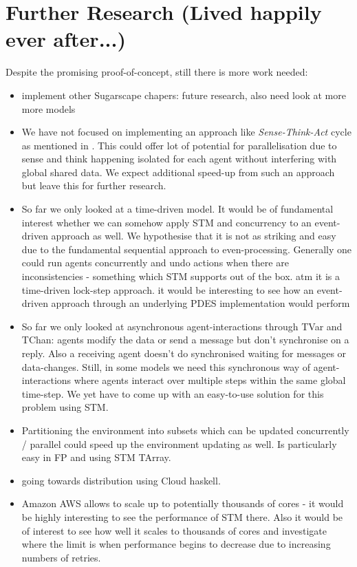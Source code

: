 \section{Further Research (Lived happily ever after...)}
Despite the promising proof-of-concept, still there is more work needed:

\begin{itemize}
	\item implement other Sugarscape chapers: future research, also need look at more more models
	\item We have not focused on implementing an approach like \textit{Sense-Think-Act} cycle as mentioned in \cite{xiao_survey_2018}. This could offer lot of potential for parallelisation due to sense and think happening isolated for each agent without interfering with global shared data. We expect additional speed-up from such an approach but leave this for further research.
	\item So far we only looked at a time-driven model. It would be of fundamental interest whether we can somehow apply STM and concurrency to an event-driven approach as well. We hypothesise that it is not as striking and easy due to the fundamental sequential approach to even-processing. Generally one could run agents concurrently and undo actions when there are inconsistencies - something which STM supports out of the box. atm it is a time-driven lock-step approach. it would be interesting to see how an event-driven approach through an underlying PDES implementation would perform
	\item So far we only looked at asynchronous agent-interactions through TVar and TChan: agents modify the data or send a message but don't synchronise on a reply. Also a receiving agent doesn't do synchronised waiting for messages or data-changes. Still, in some models we need this synchronous way of agent-interactions where agents interact over multiple steps within the same global time-step. We yet have to come up with an easy-to-use solution for this problem using STM.
	\item Partitioning the environment into subsets which can be updated concurrently / parallel could speed up the environment updating as well. Is particularly easy in FP and using STM TArray.
	\item going towards distribution using Cloud haskell.
	\item Amazon AWS allows to scale up to potentially thousands of cores - it would be highly interesting to see the performance of STM there. Also it would be of interest to see how well it scales to thousands of cores and investigate where the limit is when performance begins to decrease due to increasing numbers of retries.
\end{itemize}
